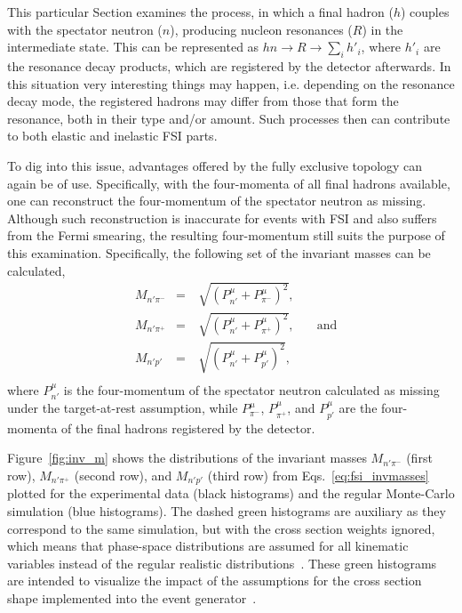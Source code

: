 This particular Section examines the process, in which a final hadron ($h$) couples with the spectator neutron ($n$), producing nucleon resonances ($R$) in the intermediate state. This can be represented as $hn \rightarrow R \rightarrow \sum_{i} h'_{i}$, where $h'_{i}$ are the resonance decay products, which are registered by the detector afterwards. In this situation very interesting things may happen, i.e. depending on the resonance decay mode, the registered hadrons may differ from those that form the resonance, both in their type and/or amount. Such processes then can contribute to both elastic and inelastic FSI parts.

To dig into this issue, advantages offered by the fully exclusive topology can again be of use. Specifically, with the four-momenta of all final hadrons available, one can reconstruct the four-momentum of the spectator neutron as missing. Although such reconstruction is inaccurate for events with FSI and also suffers from the Fermi smearing, the resulting four-momentum still suits the purpose of this examination. Specifically, the following set of the invariant masses can be calculated,%
\begin{equation}\tag{9.2}
\begin{aligned}
&M_{n'\pi^{-}}&=~& \sqrt{(P_{n'}^{\mu} + P_{\pi^{-}}^{\mu})^{2}}, & \\ \label{eq:fsi_invmasses}
&M_{n'\pi^{+}}&=~& \sqrt{(P_{n'}^{\mu} + P_{\pi^{+}}^{\mu})^{2}}, & \text{~~~and} \\ 
&M_{n'p'}&=~& \sqrt{(P_{n'}^{\mu} + P_{p'}^{\mu})^{2}}, &\\
\end{aligned}  
\end{equation}  
where $P_{n'}^{\mu}$ is the four-momentum of the spectator neutron calculated as missing under the target-at-rest assumption, while $P_{\pi^{-}}^{\mu}$, $P_{\pi^{+}}^{\mu}$, and $ P_{p'}^{\mu}$ are the four-momenta of the final hadrons registered by the detector.

Figure~\ref{fig:inv_m} shows the distributions of the invariant masses $M_{n'\pi^{-}}$ (first row), $M_{n'\pi^{+}}$ (second row), and $M_{n'p'}$ (third row) from Eqs.~\eqref{eq:fsi_invmasses} plotted for the experimental data (black histograms) and the regular Monte-Carlo simulation (blue histograms). The dashed green histograms are auxiliary as they correspond to the same simulation, but with the cross section weights ignored, which means that phase-space distributions are assumed for all kinematic variables instead of the regular realistic distributions~\cite{twopeg,twopeg-d}. These green histograms are intended to visualize the impact of the assumptions for the cross section shape implemented into the event generator~\cite{twopeg-d}.

